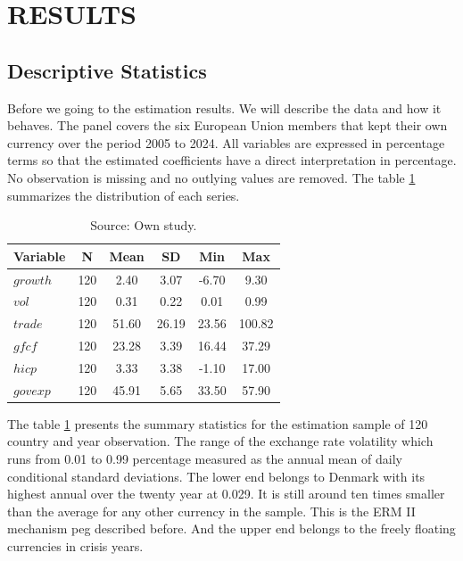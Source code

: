 \section{RESULTS}\label{sec:results}
\subsection{Descriptive Statistics}\label{subsec:data_exam}

Before we going to the estimation results.
We will describe the data and how it behaves.
The panel covers the six European Union members that kept their own currency over the period 2005 to 2024.
All variables are expressed in percentage terms so that the estimated coefficients have a direct interpretation in percentage.
No observation is missing and no outlying values are removed.
The table \ref{tab:descriptive} summarizes the distribution of each series.

\begin{table}[H]
    \centering
    \caption{Descriptive statistics for the estimation sample}
    \vspace{\baselineskip}
    \begin{tabular}{lccccc}
        \toprule
        \textbf{Variable} & \textbf{N} & \textbf{Mean} & \textbf{SD} & \textbf{Min} & \textbf{Max} \\
        \midrule
        $growth$ & 120 & 2.40 & 3.07 & -6.70 & 9.30 \\
        $vol$ & 120 & 0.31 & 0.22 & 0.01 & 0.99 \\
        $trade$ & 120 & 51.60 & 26.19 & 23.56 & 100.82 \\
        $gfcf$ & 120 & 23.28 & 3.39 & 16.44 & 37.29 \\
        $hicp$ & 120 & 3.33 & 3.38 & -1.10 & 17.00 \\
        $govexp$ & 120 & 45.91 & 5.65 & 33.50 & 57.90 \\
        \bottomrule
    \end{tabular}
    \vspace{\baselineskip}
    \caption*{\footnotesize Source: Own study.}
    \label{tab:descriptive}
\end{table}
\FloatBarrier

The table \ref{tab:descriptive} presents the summary statistics for the estimation sample of 120 country and year observation.
The range of the exchange rate volatility which runs from 0.01 to 0.99 percentage measured as the annual mean of daily conditional standard deviations.
The lower end belongs to Denmark with its highest annual over the twenty year at 0.029.
It is still around ten times smaller than the average for any other currency in the sample.
This is the ERM II mechanism peg described before.
And the upper end belongs to the freely floating currencies in crisis years.

